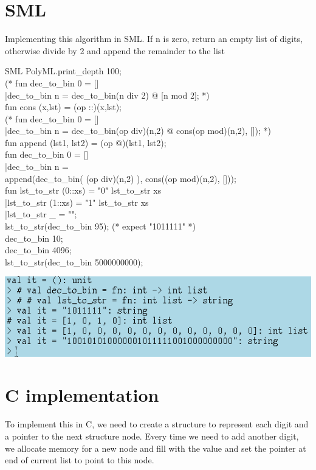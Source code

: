 \documentclass{article}
\begin{document}
\section{SML}
Implementing this algorithm in SML. If n is zero, return an empty list of digits, otherwise divide by 2 and append the remainder to the list
\begin{GFT}{SML}
\+PolyML.print\_depth 100;\\
\+(* fun dec\_to\_bin 0 = []\\
\+    |dec\_to\_bin n = dec\_to\_bin(n div 2) @ [n mod 2]; *)\\
\+fun cons (x,lst) = (op ::)(x,lst);\\
\+(* fun dec\_to\_bin 0 = []\\
\+   |dec\_to\_bin n = dec\_to\_bin(op div)(n,2) @ cons(op mod)(n,2), []); *)\\
\+fun append (lst1, lst2) = (op @)(lst1, lst2);\\
\+fun dec\_to\_bin 0 = []\\
\+   |dec\_to\_bin n = \\
\+      append(dec\_to\_bin( (op div)(n,2) ), cons((op mod)(n,2), []));\\
\+fun lst\_to\_str (0::xs) = "0" \Circumflex{} lst\_to\_str xs\\
\+   |lst\_to\_str (1::xs) = "1" \Circumflex{} lst\_to\_str xs\\
\+   |lst\_to\_str \_ = "";\\
\+lst\_to\_str(dec\_to\_bin 95); (* expect "1011111" *)\\
\+dec\_to\_bin 10;\\
\+dec\_to\_bin 4096;\\
\+lst\_to\_str(dec\_to\_bin 5000000000); \\
\end{GFT}
\pagebreak
\includegraphics[scale=0.8]{lab4sml.png}
\clearpage\section{C implementation}
To implement this in C, we need to create a structure to represent each digit and a pointer to the next structure node. Every time we need to add another digit, we allocate memory for a new node and fill with the value and set the pointer at end of current list to point to this node.
\end{document}
